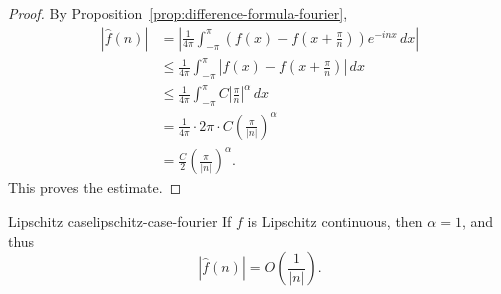 \begin{proof}
    By Proposition~\ref{prop:difference-formula-fourier},
    \begin{align*}
        |\hat{f}(n)|
         & = \left|
        \frac{1}{4\pi}\int_{-\pi}^{\pi}
        \left(f(x)-f\left(x+\frac{\pi}{n}\right)\right)e^{-inx}\,dx
        \right|                                                                  \\
         & \leq \frac{1}{4\pi}\int_{-\pi}^{\pi}
        \left|f(x)-f\left(x+\frac{\pi}{n}\right)\right|\,dx                      \\
         & \leq \frac{1}{4\pi}\int_{-\pi}^{\pi}
        C\left|\frac{\pi}{n}\right|^\alpha\,dx                                   \\
         & = \frac{1}{4\pi}\cdot 2\pi \cdot C\left(\frac{\pi}{|n|}\right)^\alpha \\
         & = \frac{C}{2}\left(\frac{\pi}{|n|}\right)^\alpha.
    \end{align*}
    This proves the estimate.
\end{proof}

\begin{remark}{Lipschitz case}{lipschitz-case-fourier}
    If \(f\) is Lipschitz continuous, then \(\alpha=1\), and thus
    \begin{equation}
        |\hat{f}(n)| = O\!\left(\frac{1}{|n|}\right).
    \end{equation}
\end{remark}